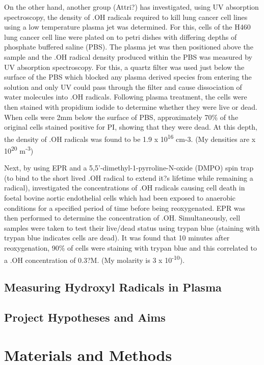 \documentclass[11pt, oneside]{article}   	%
\begin{document}
On the other hand, another group (Attri?) has investigated, using UV absorption spectroscopy, the density of .OH radicals required to kill lung cancer cell lines using a low temperature plasma jet was determined. For this, cells of the H460 lung cancer cell line were plated on to petri dishes with differing depths of phosphate buffered saline (PBS). The plasma jet was then positioned above the sample and the .OH radical density produced within the PBS was measured by UV absorption spectroscopy. For this, a quartz filter was used just below the surface of the PBS which blocked any plasma derived species from entering the solution and only UV could pass through the filter and cause dissociation of water molecules into .OH radicals. Following plasma treatment, the cells were then stained with propidium iodide to determine whether they were live or dead. When cells were 2mm below the surface of PBS, approximately 70\% of the original cells stained positive for PI, showing that they were dead.  At this depth, the density of .OH radicals was found to be 1.9 x 10\textsuperscript{16} cm-3.  (My densities are x 10\textsuperscript{20} m\textsuperscript{-3})

Next, by using EPR and a 5,5'-dimethyl-1-pyrroline-N-oxide (DMPO) spin trap (to bind to the short lived .OH radical to extend it?s lifetime while remaining a radical), \cite{Zweier1988} investigated the concentrations of .OH radicals causing cell death in foetal bovine aortic endothelial cells which had been exposed to anaerobic conditions for a specified period of time before being reoxygenated. EPR was then performed to determine the concentration of .OH. Simultaneously, cell samples were taken to test their live/dead status using trypan blue (staining with trypan blue indicates cells are dead). It was found that 10 minutes after reoxygenation, 90\% of cells were staining with trypan blue and this correlated to a .OH concentration of 0.3?M. (My molarity is 3 x 10\textsuperscript{-10}).

\subsection{Measuring Hydroxyl Radicals in Plasma}



\subsection{Project Hypotheses and Aims}


\section{Materials and Methods}
\end{document}
